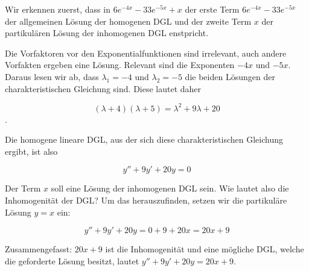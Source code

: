 \item Wir erkennen zuerst, dass in $6e^{-4x}-33e^{-5x}+x$ der erste Term $6e^{-4x}-33e^{-5x}$ der allgemeinen Lösung der homogenen DGL und der zweite Term $x$ der partikulären Lösung der inhomogenen DGL enstpricht.

Die Vorfaktoren vor den Exponentialfunktionen sind irrelevant, auch andere Vorfakten ergeben eine Lösung. Relevant sind die Exponenten $-4x$ und $-5x$. Daraus lesen wir ab, dass $\lambda_1=-4$ und $\lambda_2=-5$ die beiden Lösungen der charakteristischen Gleichung sind. Diese lautet daher 

$$
 (\lambda+4)(\lambda+5) = \lambda^2+9\lambda+20
$$.

Die homogene lineare DGL, aus der sich diese charakteristischen Gleichung ergibt, ist also

$$
	y''+9y'+20y = 0
$$

Der Term $x$ soll eine Lösung der inhomogenen DGL sein. Wie lautet also die Inhomogenität der DGL? Um das herauszufinden, setzen wir die partikuläre Lösung $y=x$ ein:

$$
	y''+9y'+20y = 0+9+20x = 20x+9
$$

Zusammengefasst: $20x+9$ ist die Inhomogenität und eine mögliche DGL, welche die geforderte Lösung besitzt, lautet  $y''+9y'+20y=20x+9$.